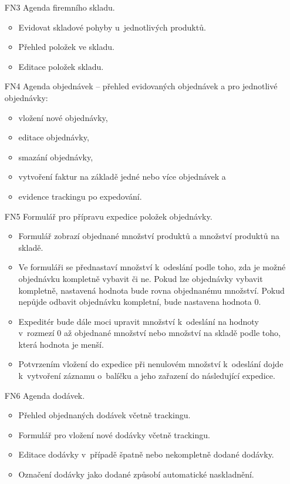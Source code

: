 \documentclass[thesis=B,czech]{FITthesis}[2012/06/26]
\begin{document}
\begin{enumerate}
	\newpage
	\item[FN3] Agenda firemního skladu.
		\begin{itemize}
			\item Evidovat skladové pohyby u~jednotlivých produktů.
			\item Přehled položek ve skladu.
			\item Editace položek skladu.
		\end{itemize}
	\item[FN4] Agenda objednávek -- přehled evidovaných objednávek a pro jednotlivé objednávky:
	\begin{itemize}
		\item vložení nové objednávky,
		\item editace objednávky,
		\item smazání objednávky,
		\item vytvoření faktur na základě jedné nebo více objednávek a
		\item evidence trackingu po expedování.
	\end{itemize}
	\item[FN5] Formulář pro přípravu expedice položek objednávky.
	\begin{itemize}
		\item Formulář zobrazí objednané množství produktů a množství produktů na skladě. 
		\item Ve formuláři se přednastaví množství k~odeslání podle toho, zda je možné objednávku kompletně vybavit či ne. Pokud lze objednávky vybavit kompletně, nastavená hodnota bude rovna objednanému množství. Pokud nepůjde odbavit objednávku kompletní, bude nastavena hodnota 0.
		\item Expeditér bude dále moci upravit množství k~odeslání na hodnoty v~rozmezí 0 až objednané množství nebo množství na skladě podle toho, která hodnota je menší.
		\item Potvrzením vložení do expedice při nenulovém množství k~odeslání dojde k~vytvoření záznamu o~balíčku a jeho zařazení do následující expedice.
	\end{itemize}
	\item[FN6] Agenda dodávek.
	\begin{itemize}
		\item Přehled objednaných dodávek včetně trackingu.
		\item Formulář pro vložení nové dodávky včetně trackingu.
		\item Editace dodávky v~případě špatně nebo nekompletně dodané dodávky.
		\item Označení dodávky jako dodané způsobí automatické naskladnění.

\end{itemize}
\end{enumerate}
\end{document}
